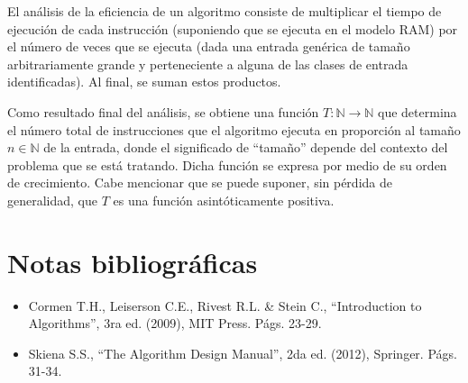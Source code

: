El análisis de la eficiencia de un algoritmo consiste de multiplicar
el tiempo de ejecución de cada instrucción (suponiendo que se ejecuta
en el modelo RAM) por el número de veces que se ejecuta (dada una
entrada genérica de tamaño arbitrariamente grande y perteneciente
a alguna de las clases de entrada identificadas). Al final, se suman
estos productos. 

Como resultado final del análisis, se obtiene una función $T:\mathbb{N}\to\mathbb{N}$
que determina el número total de instrucciones que el algoritmo ejecuta
en proporción al tamaño $n\in\mathbb{N}$ de la entrada, donde el
significado de ``tamaño'' depende del contexto del problema que
se está tratando. Dicha función se expresa por medio de su orden de
crecimiento. Cabe mencionar que se puede suponer, sin pérdida de generalidad,
que $T$ es una función asintóticamente positiva. 

\section*{Notas bibliográficas}
\begin{itemize}
\item Cormen T.H., Leiserson C.E., Rivest R.L. \& Stein C., ``Introduction
to Algorithms'', 3ra ed. (2009), MIT Press. Págs. 23-29.
\item Skiena S.S., ``The Algorithm Design Manual'', 2da ed. (2012), Springer.
Págs. 31-34.
\end{itemize}

